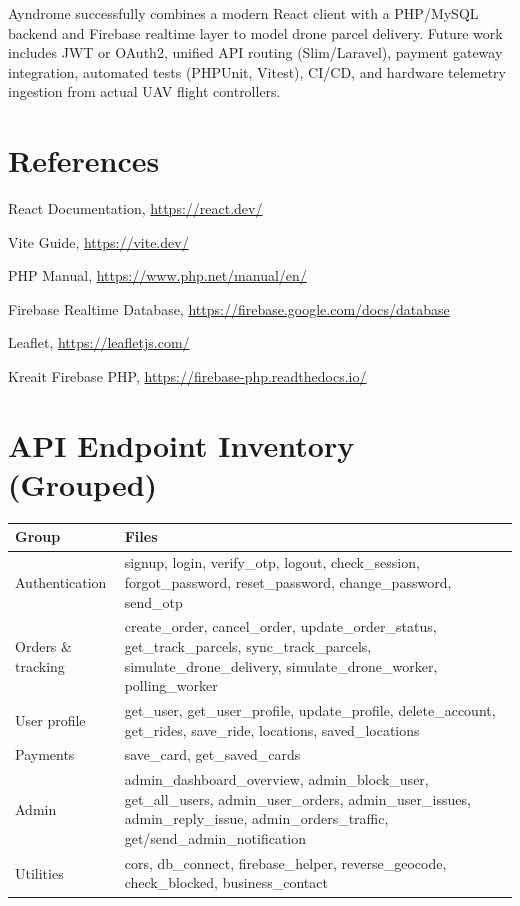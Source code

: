 \documentclass[12pt,a4paper,oneside]{report}
\begin{document}
Ayndrome successfully combines a modern React client with a PHP/MySQL backend and Firebase
realtime layer to model drone parcel delivery. Future work includes JWT or OAuth2, unified API
routing (Slim/Laravel), payment gateway integration, automated tests (PHPUnit, Vitest), CI/CD,
and hardware telemetry ingestion from actual UAV flight controllers.

\chapter*{References}
\begin{enumerate}[label={[\arabic*]}]
    \item React Documentation, \url{https://react.dev/}
    \item Vite Guide, \url{https://vite.dev/}
    \item PHP Manual, \url{https://www.php.net/manual/en/}
    \item Firebase Realtime Database, \url{https://firebase.google.com/docs/database}
    \item Leaflet, \url{https://leafletjs.com/}
    \item Kreait Firebase PHP, \url{https://firebase-php.readthedocs.io/}
\end{enumerate}

\appendix
\chapter{API Endpoint Inventory (Grouped)}
\begin{longtable}{@{}p{}p{}@{}}
    \toprule
    \textbf{Group} & \textbf{Files} \\
    \midrule
    \endhead
    Authentication &
    signup, login, verify\_otp, logout, check\_session, forgot\_password, reset\_password,
    change\_password, send\_otp \\
    Orders \& tracking &
    create\_order, cancel\_order, update\_order\_status, get\_track\_parcels, sync\_track\_parcels,
    simulate\_drone\_delivery, simulate\_drone\_worker, polling\_worker \\
    User profile &
    get\_user, get\_user\_profile, update\_profile, delete\_account, get\_rides, save\_ride,
    locations, saved\_locations \\
    Payments &
    save\_card, get\_saved\_cards \\
    Admin &
    admin\_dashboard\_overview, admin\_block\_user, get\_all\_users, admin\_user\_orders,
    admin\_user\_issues, admin\_reply\_issue, admin\_orders\_traffic, get/send\_admin\_notification \\
    Utilities &
    cors, db\_connect, firebase\_helper, reverse\_geocode, check\_blocked, business\_contact \\
    \bottomrule
\end{longtable}
\end{document}
